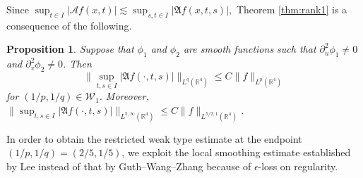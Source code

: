 \documentclass[10pt] %
{amsart}
\theoremstyle{plain}
\newtheorem{prop}[thm]{Proposition}
\numberwithin{equation}{section}
\begin{document}
Since
$
\sup_{t\in I} |\mathcal Af(x,t)|\lesssim \sup_{s,t\in I} |\mathfrak A f(x,t,s)| ,
$
Theorem \ref{thm:rank1} is a consequence of the following. 
\begin{prop}\label{low-reg}
Suppose that $\phi_1$ and $\phi_2$ are smooth functions such that $\partial_u^2\phi_1\neq 0$ and $\partial_v^2\phi_2\neq0$.
Then
\[
\big\|\sup_{t,s \in I }|\mathfrak Af(\cdot,t,s)| \big\|_{L^{q }(\mathbb R^4)} \le C  
\|f\|_{L^{p }(\mathbb R^4)}
\]
for $(1/p,1/q) \in \mathcal W_1$.
Moreover, $\big\|\sup_{t,s \in I }|\mathfrak Af(\cdot,t,s)| \big\|_{L^{5,\infty}(\mathbb R^4)} \le C  
\|f\|_{L^{5/2,1}(\mathbb R^4)}$.
\end{prop}

In order to obtain the restricted weak type estimate at the endpoint $(1/p,1/q) = (2/5,1/5)$, we exploit the local smoothing estimate established by Lee \cite{Lee} instead of that by Guth--Wang--Zhang \cite{GWZ} because of $\epsilon$-loss on regularity. 
  
\end{document}
